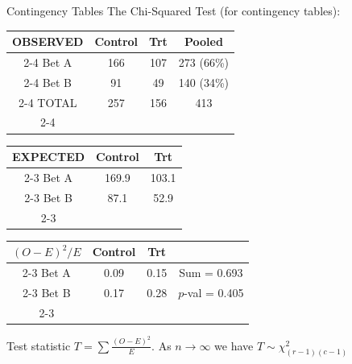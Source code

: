 \begin{frame}{Contingency Tables}
The Chi-Squared Test (for contingency tables):\\
\begin{center}
    \begin{tabular}{c|c|c||c|}
         OBSERVED & Control & Trt & Pooled\\   
         \cline{2-4}
         Bet A & 166 & 107 & 273 (66\%) \\
         \cline{2-4}
         Bet B & 91 & 49 & 140 (34\%) \\
         \cline{2-4}
         TOTAL & 257 & 156 & 413\\
         \cline{2-4}
    \end{tabular}
    \br
    \begin{tabular}{c|c|c|}
         EXPECTED & Control & Trt \\   
         \cline{2-3}
         Bet A & 169.9 & 103.1  \\
         \cline{2-3}
         Bet B & 87.1 & 52.9 \\
         \cline{2-3}
    \end{tabular}
    \br
    \begin{tabular}{c|c|c|c}
         $(O-E)^2/E$ & Control & Trt &  \\   
         \cline{2-3}
         Bet A & 0.09 & 0.15 & Sum = 0.693 \\
         \cline{2-3}
         Bet B & 0.17 & 0.28 & $p$-val = 0.405\\
         \cline{2-3}         
    \end{tabular}
\end{center}
\br
Test statistic $T = \sum \frac{(O-E)^2}{E}$. As $n\rightarrow \infty$ we have $T\sim \chi^2_{(r-1)(c-1)}$
    
\end{frame}

